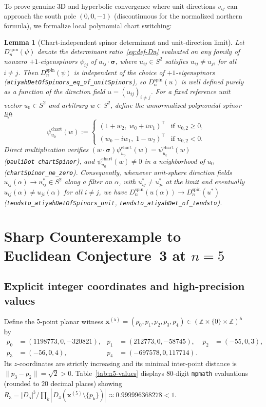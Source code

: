 \documentclass[11pt,reqno]{amsart}
\newtheorem{lemma}[theorem]{Lemma}
\theoremstyle{remark}
\newcommand{\Z}{\mathbb{Z}}
\begin{document}
To prove genuine 3D and hyperbolic convergence where unit directions $v_{ij}$ can approach the south pole $(0, 0, -1)$ (discontinuous for the normalized northern formula), we formalize local polynomial chart switching:

\begin{lemma}[Chart-independent spinor determinant and unit-direction limit]\label{lem:chart-limit}
Let $D_n^{\mathrm{spin}}(\psi)$ denote the determinant ratio~\eqref{eq:def-Dn} evaluated on any family of nonzero $+1$-eigenspinors $\psi_{ij}$ of $u_{ij} \cdot \boldsymbol{\sigma}$, where $u_{ij} \in S^2$ satisfies $u_{ij} \ne u_{ji}$ for all $i \ne j$.
Then $D_n^{\mathrm{spin}}(\psi)$ is independent of the choice of $+1$-eigenspinors (\texttt{atiyahDetOfSpinors\_eq\_of\_unitSpinors}), so $D_n^{\mathrm{spin}}(u)$ is well defined purely as a function of the direction field $u = (u_{ij})_{i \ne j}$.
For a fixed reference unit vector $u_0 \in S^2$ and arbitrary $w \in S^2$, define the unnormalized polynomial spinor lift
\[
  \psi_{u_0}^{\mathrm{chart}}(w) := \begin{cases}
    (1 + w_2,\; w_0 + i w_1)^\top & \text{if } u_{0,2} \ge 0,\\
    (w_0 - i w_1,\; 1 - w_2)^\top & \text{if } u_{0,2} < 0.
  \end{cases}
\]
Direct multiplication verifies $(w \cdot \boldsymbol{\sigma})\psi_{u_0}^{\mathrm{chart}}(w) = \psi_{u_0}^{\mathrm{chart}}(w)$ (\texttt{pauliDot\_chartSpinor}), and $\psi_{u_0}^{\mathrm{chart}}(w) \ne 0$ in a neighborhood of $u_0$ (\texttt{chartSpinor\_ne\_zero}).
Consequently, whenever unit-sphere direction fields $u_{ij}(\alpha) \to u_{ij}^* \in S^2$ along a filter on $\alpha$, with $u_{ij}^* \ne u_{ji}^*$ at the limit and eventually $u_{ij}(\alpha) \ne u_{ji}(\alpha)$ for all $i \ne j$, we have $D_n^{\mathrm{spin}}(u(\alpha)) \to D_n^{\mathrm{spin}}(u^*)$ (\texttt{tendsto\_atiyahDetOfSpinors\_unit}, \texttt{tendsto\_atiyahDet\_of\_tendsto}).
\end{lemma}

\section{Sharp Counterexample to Euclidean Conjecture~3 at $n = 5$}\label{sec:n5}

\subsection{Explicit integer coordinates and high-precision values}
Define the $5$-point planar witness $\mathbf{x}^{(5)} = (p_0, p_1, p_2, p_3, p_4) \in (\Z \times \{0\} \times \Z)^5$ by
\begin{align*}
  p_0 &= (1198773, 0, -320821), &
  p_1 &= (212773, 0, -58745), &
  p_2 &= (-55, 0, 3), \\
  p_3 &= (-56, 0, 4), &
  p_4 &= (-697578, 0, 117714).
\end{align*}
Its $z$-coordinates are strictly increasing and its minimal inter-point distance is $\|p_3 - p_2\| = \sqrt{2} > 0$.
Table~\ref{tab:n5-values} displays $80$-digit \texttt{mpmath} evaluations (rounded to $20$ decimal places) showing $R_3 = |D_5|^3 / \prod_k |D_4(\mathbf{x}^{(5)} \setminus \{p_k\})| \approx 0.999996368278 < 1$.
\end{document}
